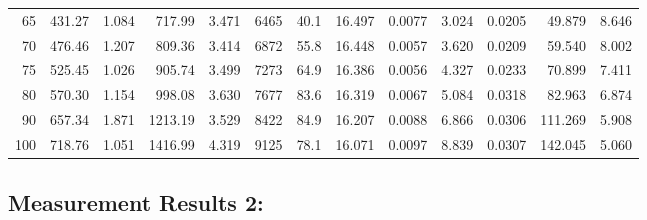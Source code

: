 \documentclass[10pt]{article}
\begin{document}
{\begin{tabular}{|r|rr|rr|rr|rr|rr|r|r|}
       65 &       431.27 &        1.084 &       717.99 &        3.471 &         6465 &         40.1 &       16.497 &       0.0077 &        3.024 &       0.0205 &       49.879 &        8.646 \\
       70 &       476.46 &        1.207 &       809.36 &        3.414 &         6872 &         55.8 &       16.448 &       0.0057 &        3.620 &       0.0209 &       59.540 &        8.002 \\
       75 &       525.45 &        1.026 &       905.74 &        3.499 &         7273 &         64.9 &       16.386 &       0.0056 &        4.327 &       0.0233 &       70.899 &        7.411 \\
       80 &       570.30 &        1.154 &       998.08 &        3.630 &         7677 &         83.6 &       16.319 &       0.0067 &        5.084 &       0.0318 &       82.963 &        6.874 \\
       90 &       657.34 &        1.871 &      1213.19 &        3.529 &         8422 &         84.9 &       16.207 &       0.0088 &        6.866 &       0.0306 &      111.269 &        5.908 \\
      100 &       718.76 &        1.051 &      1416.99 &        4.319 &         9125 &         78.1 &       16.071 &       0.0097 &        8.839 &       0.0307 &      142.045 &        5.060 \\
\hline
\end{tabular}
}



\subsection*{\large \bf Measurement Results 2:}
\end{document}
